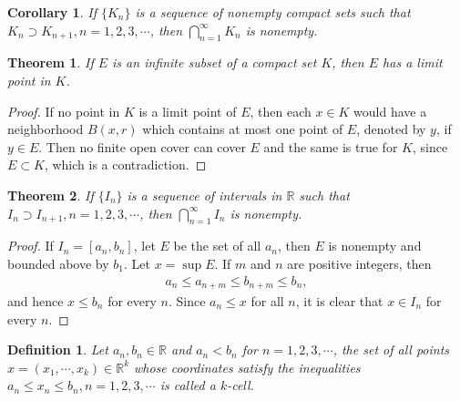 \documentclass[10pt]{book}
\newtheorem{definition}{Definition}[chapter]
\newtheorem{theorem}{Theorem}[chapter]
\newtheorem{corollary}{Corollary}[theorem]
\theoremstyle{definition}
\numberwithin{equation}{chapter}
\begin{document}
\medskip

\begin{corollary}\label{coro_118_1}
If $\{K_n\}$ is a sequence of nonempty compact sets such that $K_n \supset K_{n+1}, n = 1,2,3,\cdots$, then $\bigcap^\infty_{n=1} K_n$ is nonempty.
\end{corollary}

\medskip

\begin{theorem}\label{th_119}
If $E$ is an infinite subset of a compact set $K$, then $E$ has a limit point in $K$.
\end{theorem}
\begin{proof}
If no point in $K$ is a limit point of $E$, then each $x \in K$ would have a neighborhood $B(x,r)$ which contains at most one point of $E$, denoted by $y$, if $y \in E$. Then no finite open cover can cover $E$ and the same is true for $K$, since $E \subset K$, which is a contradiction.
\end{proof}

\medskip

\begin{theorem}\label{th_120}
If $\{I_n\}$ is a sequence of intervals in $\mathbb{R}$ such that $I_n \supset I_{n+1}, n = 1,2,3,\cdots$, then $\bigcap^\infty_{n=1} I_n$ is nonempty.
\end{theorem}
\begin{proof}
If $I_n = [a_n, b_n]$, let $E$ be the set of all $a_n$, then $E$ is nonempty and bounded above by $b_1$. Let $x = \sup E$. If $m$ and $n$ are positive integers, then 
\begin{align*}
    a_n \leq a_{n+m} \leq b_{n+m} \leq b_n,
\end{align*}
and hence $x \leq b_n$ for every $n$. Since $a_n \leq x$ for all $n$, it is clear that $x \in I_n$ for every $n$.
\end{proof}

\medskip

\begin{definition}
Let $a_n, b_n \in \mathbb{R}$ and $a_n < b_n$ for $n = 1,2,3,\cdots$, the set of all points $x = (x_1, \cdots, x_k) \in \mathbb{R}^k$ whose coordinates satisfy the inequalities $a_n \leq x_n \leq b_n, n = 1,2,3,\cdots$ is called a $k$-cell.
\end{definition}

\medskip
\end{document}
